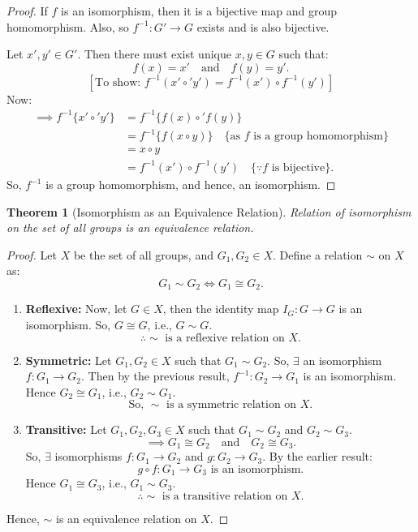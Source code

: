 \documentclass[12pt]{article}
\theoremstyle{definition}
\theoremstyle{plain}
\newtheorem{theorem}{Theorem}[section]
\begin{document}
\begin{proof}
If $f$ is an isomorphism, then it is a bijective map and group homomorphism.
Also, so $f^{-1}: G' \longrightarrow G$ exists and is also bijective.

Let $x', y' \in G'$. Then there must exist unique $x, y \in G$ such that:
\[
f(x) = x' \quad \text{and} \quad f(y) = y'.
\]
\[
\left[\text{To show: } f^{-1}(x' \circ' y') = f^{-1}(x') \circ f^{-1}(y')\right]
\]
Now:
\begin{align*}
\implies f^{-1}\{x' \circ' y'\} &= f^{-1}\{f(x) \circ' f(y)\} \\
&= f^{-1}\{f(x \circ y)\} \quad \{\text{as } f \text{ is a group homomorphism}\} \\
&= x \circ y \\
&= f^{-1}(x') \circ f^{-1}(y') \quad \{\because f \text{ is bijective}\}.
\end{align*}
So, $f^{-1}$ is a group homomorphism, and hence, an isomorphism.
\end{proof}

\begin{theorem}[Isomorphism as an Equivalence Relation]
Relation of isomorphism on the set of all groups is an equivalence relation.
\end{theorem}

\begin{proof}
Let $X$ be the set of all groups, and $G_1, G_2 \in X$. Define a relation $\sim$ on $X$ as:
\[
G_1 \sim G_2 \iff G_1 \cong G_2.
\]
\begin{enumerate}
    \item \textbf{Reflexive:}
    Now, let $G \in X$, then the identity map $I_G: G \longrightarrow G$ is an isomorphism.
    So, $G \cong G$, i.e., $G \sim G$.
    \[
    \therefore \sim \text{ is a reflexive relation on } X.
    \]

    \item \textbf{Symmetric:}
    Let $G_1, G_2 \in X$ such that $G_1 \sim G_2$.
    So, $\exists$ an isomorphism $f: G_1 \longrightarrow G_2$.
    Then by the previous result, $f^{-1}: G_2 \longrightarrow G_1$ is an isomorphism.
    Hence $G_2 \cong G_1$, i.e., $G_2 \sim G_1$.
    \[
    \text{So, } \sim \text{ is a symmetric relation on } X.
    \]

    \item \textbf{Transitive:}
    Let $G_1, G_2, G_3 \in X$ such that $G_1 \sim G_2$ and $G_2 \sim G_3$.
    \[
    \implies G_1 \cong G_2 \quad \text{and} \quad G_2 \cong G_3.
    \]
    So, $\exists$ isomorphisms $f: G_1 \longrightarrow G_2$ and $g: G_2 \longrightarrow G_3$.
    By the earlier result:
    \[
    g \circ f: G_1 \longrightarrow G_3 \text{ is an isomorphism.}
    \]
    Hence $G_1 \cong G_3$, i.e., $G_1 \sim G_3$.
    \[
    \therefore \sim \text{ is a transitive relation on } X.
    \]
\end{enumerate}
Hence, $\sim$ is an equivalence relation on $X$.
\end{proof}
\end{document}
